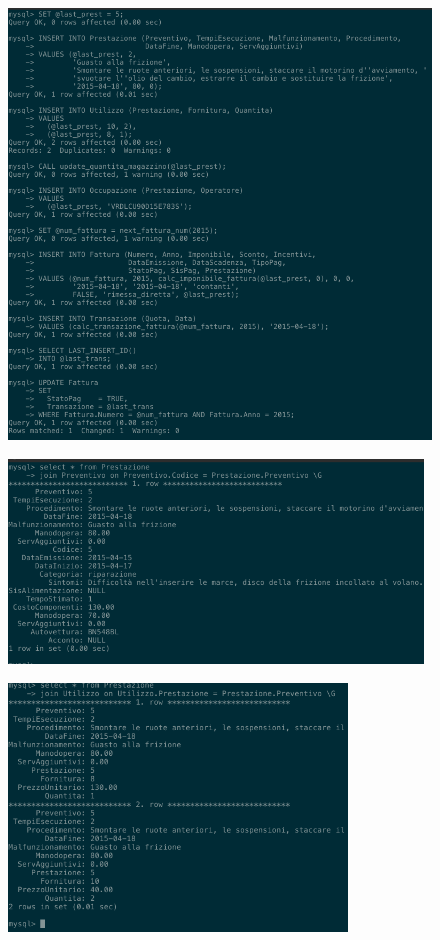         \begin{figure}[H]
          \centering
          \includegraphics[width=13cm]{images/screenshots/nuova_prestazione_1.png}
        \end{figure}
        \begin{figure}[H]
          \centering
          \includegraphics[width=11cm]{images/screenshots/nuova_prestazione_2.png}
        \end{figure}
        \begin{figure}[H]
          \centering
          \includegraphics[width=9cm]{images/screenshots/nuova_prestazione_3.png}
        \end{figure}
